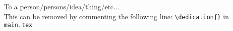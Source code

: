 \begin{center}
To a person/persons/idea/thing/etc...\\
This can be removed by commenting the following line:
\verb+\dedication{}+ in \verb+main.tex+
\end{center}
